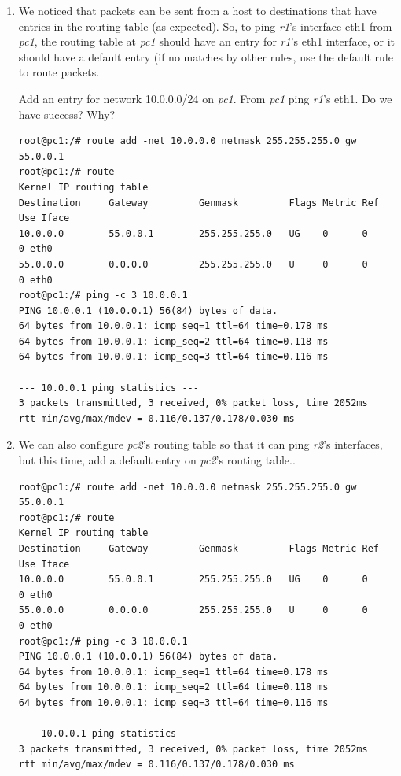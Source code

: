 \documentclass[12pt]{book}
\begin{document}
\begin{enumerate}[resume*]
\item We noticed that packets can be sent from a host to destinations that have entries in the routing table (as expected). So, to ping \emph{r1}'s interface eth1 from \emph{pc1}, the routing table at \emph{pc1} should have an entry for \emph{r1}'s eth1 interface, or it should have a default entry (if no matches by other rules, use the default rule to route packets.

  Add an entry for network 10.0.0.0/24 on \emph{pc1}. From \emph{pc1} ping \emph{r1}'s eth1. Do we have success? Why?

  \begin{lstlisting}
root@pc1:/# route add -net 10.0.0.0 netmask 255.255.255.0 gw 55.0.0.1
root@pc1:/# route
Kernel IP routing table
Destination     Gateway         Genmask         Flags Metric Ref    Use Iface
10.0.0.0        55.0.0.1        255.255.255.0   UG    0      0        0 eth0
55.0.0.0        0.0.0.0         255.255.255.0   U     0      0        0 eth0
root@pc1:/# ping -c 3 10.0.0.1
PING 10.0.0.1 (10.0.0.1) 56(84) bytes of data.
64 bytes from 10.0.0.1: icmp_seq=1 ttl=64 time=0.178 ms
64 bytes from 10.0.0.1: icmp_seq=2 ttl=64 time=0.118 ms
64 bytes from 10.0.0.1: icmp_seq=3 ttl=64 time=0.116 ms

--- 10.0.0.1 ping statistics ---
3 packets transmitted, 3 received, 0% packet loss, time 2052ms
rtt min/avg/max/mdev = 0.116/0.137/0.178/0.030 ms
  \end{lstlisting}

\item We can also configure \emph{pc2}'s routing table so that it can ping \emph{r2}'s interfaces, but this time, add a default entry on \emph{pc2}'s routing table..

  \begin{lstlisting}
root@pc1:/# route add -net 10.0.0.0 netmask 255.255.255.0 gw 55.0.0.1
root@pc1:/# route
Kernel IP routing table
Destination     Gateway         Genmask         Flags Metric Ref    Use Iface
10.0.0.0        55.0.0.1        255.255.255.0   UG    0      0        0 eth0
55.0.0.0        0.0.0.0         255.255.255.0   U     0      0        0 eth0
root@pc1:/# ping -c 3 10.0.0.1
PING 10.0.0.1 (10.0.0.1) 56(84) bytes of data.
64 bytes from 10.0.0.1: icmp_seq=1 ttl=64 time=0.178 ms
64 bytes from 10.0.0.1: icmp_seq=2 ttl=64 time=0.118 ms
64 bytes from 10.0.0.1: icmp_seq=3 ttl=64 time=0.116 ms

--- 10.0.0.1 ping statistics ---
3 packets transmitted, 3 received, 0% packet loss, time 2052ms
rtt min/avg/max/mdev = 0.116/0.137/0.178/0.030 ms
  \end{lstlisting}


\end{enumerate}
\end{document}
